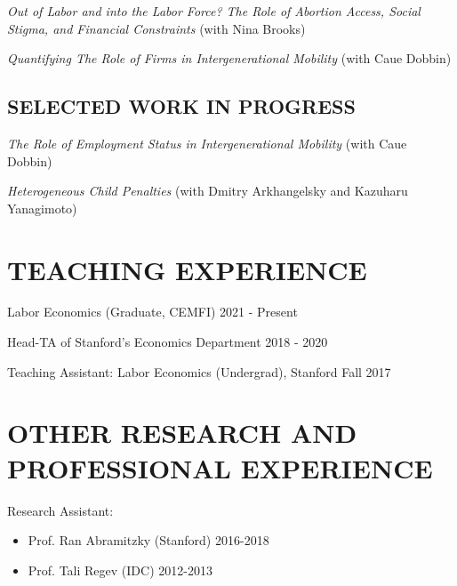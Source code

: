 \documentclass[margin]{res} %
\newcommand{\rootFolder}{/Users/tomzohar/Dropbox/}
\begin{document}
\begin{resume}
\textit{Out of Labor and into the Labor Force? The Role of Abortion Access, Social Stigma, and Financial Constraints} (with Nina Brooks) 

%

\textit{Quantifying The Role of Firms in Intergenerational Mobility} (with Caue Dobbin) 

\subsection{SELECTED WORK IN PROGRESS}

\textit{The Role of Employment Status in Intergenerational Mobility} (with Caue Dobbin) 

\textit{Heterogeneous Child Penalties} (with Dmitry Arkhangelsky and Kazuharu Yanagimoto)





\section{TEACHING EXPERIENCE}

Labor Economics (Graduate, CEMFI) \hfill 2021 - Present

Head-TA of Stanford's Economics Department \hfill 2018 - 2020

Teaching Assistant: Labor Economics (Undergrad), Stanford \hfill Fall 2017

 
\section{OTHER RESEARCH AND PROFESSIONAL EXPERIENCE}
 Research Assistant:
\begin{itemize}
	\item Prof. Ran Abramitzky (Stanford) \hfill 2016-2018
	\item Prof. Tali Regev (IDC) \hfill 2012-2013
\end{itemize}
 

\end{resume}
\end{document}
